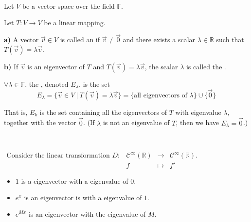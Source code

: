 \documentclass[11pt,fleqn]{book} %
\begin{document}
\setcounter{chapter}{4}
\setcounter{definitionT}{1}
\begin{definition}

    Let $V$ be a vector space over the field $\mathbb{F}$.

    Let $T: V \to V$ be a linear mapping.

    \textbf{a)} A vector $\vec{v} \in V$ is called an  if $\vec{v} \neq \vec{0}$ and there exists a scalar $\lambda \in \mathbb{R}$ such that $T(\vec{v}) = \lambda \vec{v}$.

    \textbf{b)} If $\vec{v}$ is an eigenvector of $T$ and $T(\vec{v}) = \lambda\vec{v}$, the scalar $\lambda$ is called the .
\end{definition}

\setcounter{chapter}{4}
\setcounter{definitionT}{5}
\begin{definition}[Eigenspace]

    $\forall \lambda \in \mathbb{F}$, the , denoted $E_\lambda$, is the set $$E_\lambda = \{ \vec{v} \in V ~|~ T(\vec{v}) = \lambda \vec{v} \} = \{ \text{all eigenvectors of } \lambda \} \cup \{ \vec{0} \}$$

    That is, $E_k$ is the set containing all the eigenvectors of $T$ with eigenvalue $\lambda$, together with the vector $\vec{0}$. (If $\lambda$ is not an eigenvalue of $T$, then we have $E_\lambda = {\vec{0}}$.)
\end{definition}
\setcounter{chapter}{3}

\begin{example}
{~~~}

    $\begin{matrix} \text{Consider the linear transformation } D: &\mathcal{C}^\infty(\mathbb{R}) &\to &\mathcal{C}^\infty(\mathbb{R}). \\ &f &\mapsto &f' \end{matrix}$

    \begin{itemize}
        \item $1$ is a eigenvector with a eigenvalue of $0$.

        \item $e^x$ is an eigenvector is with a eigenvalue of $1$.

        \item $e^{Mx}$ is an eigenvector with the eigenvalue of $M$.
    \end{itemize}
\end{example}
\end{document}
